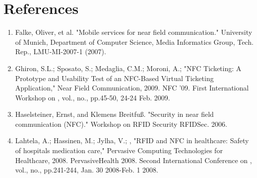 \documentclass{sigchi}
\newcommand\tabhead[1]{\small\textbf{#1}}
\begin{document}

\section{References}

\begin{enumerate}
\item Falke, Oliver, et al. "Mobile services for near field communication." University of Munich, Department of Computer Science, Media Informatics Group, Tech. Rep., LMU-MI-2007-1 (2007).

\item Ghiron, S.L.; Sposato, S.; Medaglia, C.M.; Moroni, A.; "NFC Ticketing: A Prototype and Usability Test of an NFC-Based Virtual Ticketing Application," Near Field Communication, 2009. NFC '09. First International Workshop on , vol., no., pp.45-50, 24-24 Feb. 2009.

\item Haselsteiner, Ernst, and Klemens Breitfuß. "Security in near field communication (NFC)." Workshop on RFID Security RFIDSec. 2006.

\item Lahtela, A.; Hassinen, M.; Jylha, V.; , "RFID and NFC in healthcare: Safety of hospitals medication care," Pervasive Computing Technologies for Healthcare, 2008. PervasiveHealth 2008. Second International Conference on , vol., no., pp.241-244, Jan. 30 2008-Feb. 1 2008.
\end{enumerate}

\end{document}
